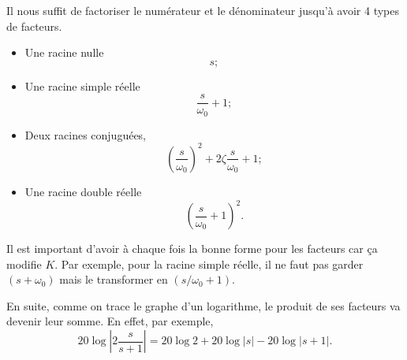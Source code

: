 Il nous suffit de factoriser le numérateur et le dénominateur
jusqu'à avoir 4 types de facteurs.
\begin{itemize}
  \item Une racine nulle
    \[ s; \]
  \item Une racine simple réelle
    \[ \frac{s}{\omega_0} + 1; \]
  \item Deux racines conjuguées,
    \[ \left(\frac{s}{\omega_0}\right)^2 +
    2\zeta\frac{s}{\omega_0} + 1; \]
  \item Une racine double réelle
    \[ \left(\frac{s}{\omega_0} + 1\right)^2. \]
\end{itemize}
Il est important d'avoir à chaque fois la bonne forme pour les facteurs
car ça modifie $K$.
Par exemple, pour la racine simple réelle, il ne faut pas garder
$(s + \omega_0)$ mais le transformer en $(s/\omega_0 + 1)$.

En suite, comme on trace le graphe d'un logarithme,
le produit de ses facteurs va devenir leur somme.
En effet, par exemple,
\[ 20\log\left|2\frac{s}{s + 1}\right| =
20\log 2 + 20\log|s| - 20\log|s+1|. \]

